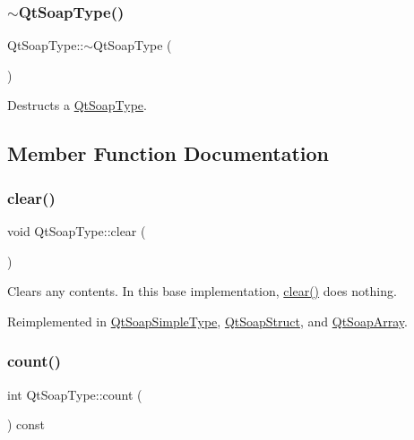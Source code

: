 \subsubsection{\texorpdfstring{$\sim$\+Qt\+Soap\+Type()}{~QtSoapType()}}
{\footnotesize\ttfamily Qt\+Soap\+Type\+::$\sim$\+Qt\+Soap\+Type (\begin{DoxyParamCaption}{ }\end{DoxyParamCaption})\hspace{0.3cm}{\ttfamily [virtual]}}

Destructs a \mbox{\hyperlink{class_qt_soap_type}{Qt\+Soap\+Type}}. 

\subsection{Member Function Documentation}
\mbox{\label{class_qt_soap_type_a9fac9664d334143114c31610ef02c53d}} 
\subsubsection{\texorpdfstring{clear()}{clear()}}
{\footnotesize\ttfamily void Qt\+Soap\+Type\+::clear (\begin{DoxyParamCaption}{ }\end{DoxyParamCaption})\hspace{0.3cm}{\ttfamily [virtual]}}

Clears any contents. In this base implementation, \mbox{\hyperlink{class_qt_soap_type_a9fac9664d334143114c31610ef02c53d}{clear()}} does nothing. 

Reimplemented in \mbox{\hyperlink{class_qt_soap_simple_type_a046134cfc66fd8c72f6d80203d22b0c2}{Qt\+Soap\+Simple\+Type}}, \mbox{\hyperlink{class_qt_soap_struct_a22f59c734dc676b9906e0d657052897f}{Qt\+Soap\+Struct}}, and \mbox{\hyperlink{class_qt_soap_array_a51440ed0ef64c0048bbc46dc5fbe4003}{Qt\+Soap\+Array}}.

\mbox{\label{class_qt_soap_type_a8d6c4868a786f3b7fd6784a45501e16f}} 
\subsubsection{\texorpdfstring{count()}{count()}}
{\footnotesize\ttfamily int Qt\+Soap\+Type\+::count (\begin{DoxyParamCaption}{ }\end{DoxyParamCaption}) const\hspace{0.3cm}{\ttfamily [virtual]}}

